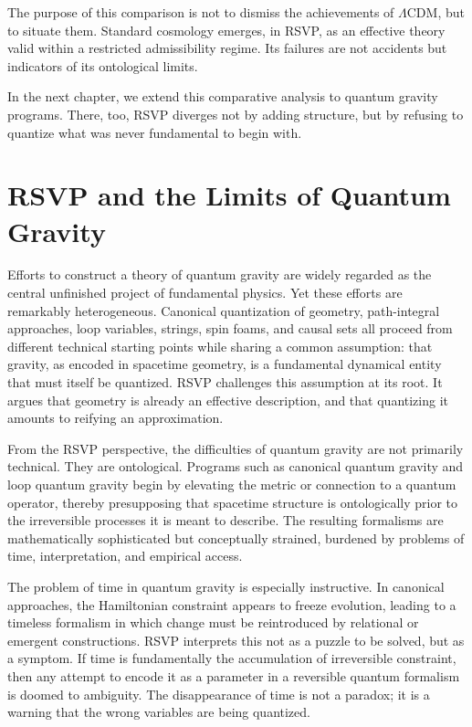 \documentclass[11pt,oneside]{book}
\begin{document}
The purpose of this comparison is not to dismiss the achievements of \(\Lambda\)CDM, but to situate them. Standard cosmology emerges, in RSVP, as an effective theory valid within a restricted admissibility regime. Its failures are not accidents but indicators of its ontological limits.

In the next chapter, we extend this comparative analysis to quantum gravity programs. There, too, RSVP diverges not by adding structure, but by refusing to quantize what was never fundamental to begin with.

\chapter{RSVP and the Limits of Quantum Gravity}

Efforts to construct a theory of quantum gravity are widely regarded as the central unfinished project of fundamental physics. Yet these efforts are remarkably heterogeneous. Canonical quantization of geometry, path-integral approaches, loop variables, strings, spin foams, and causal sets all proceed from different technical starting points while sharing a common assumption: that gravity, as encoded in spacetime geometry, is a fundamental dynamical entity that must itself be quantized. RSVP challenges this assumption at its root. It argues that geometry is already an effective description, and that quantizing it amounts to reifying an approximation.

From the RSVP perspective, the difficulties of quantum gravity are not primarily technical. They are ontological. Programs such as canonical quantum gravity and loop quantum gravity begin by elevating the metric or connection to a quantum operator, thereby presupposing that spacetime structure is ontologically prior to the irreversible processes it is meant to describe. The resulting formalisms are mathematically sophisticated but conceptually strained, burdened by problems of time, interpretation, and empirical access.

The problem of time in quantum gravity is especially instructive. In canonical approaches, the Hamiltonian constraint appears to freeze evolution, leading to a timeless formalism in which change must be reintroduced by relational or emergent constructions. RSVP interprets this not as a puzzle to be solved, but as a symptom. If time is fundamentally the accumulation of irreversible constraint, then any attempt to encode it as a parameter in a reversible quantum formalism is doomed to ambiguity. The disappearance of time is not a paradox; it is a warning that the wrong variables are being quantized.
\end{document}
